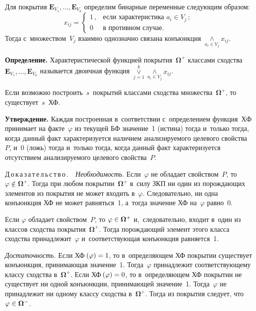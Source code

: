 \begin{multicols}{2}
  Для покрытия $\mathbf{E}_{V_1},\ldots , \mathbf{E}_{V_k}$ определим 
бинарные переменные следующим образом:
  $$
  x_{ij}=\begin{cases}
  1\,, & \mbox{если\ характеристика } a_i\in V_j\,;\\
  0 & \mbox{в~противном случае}.
  \end{cases}
  $$
  Тогда с~множеством~$V_j$ взаимно однозначно связана конъюнкция 
$\mathop{\wedge}\limits_{a_i\in V_j} x_{ij}$.
  
  \smallskip
  
  \noindent
  \textbf{Определение.} Характеристической функцией 
покрытия~$\boldsymbol{\Omega}^+$ классами сходства $\mathbf{E}_{V_1},\ldots 
, \mathbf{E}_{V_k}$ называется двоичная функция  
$\mathop{\vee}\limits^k_{j=1}\mathop{\wedge}\limits_{a_i\in V_j} x_{ij}$.
  
  Если возможно построить~$s$~покрытий классами сходства 
множества~$\boldsymbol{\Omega}^+$, то существует~$s$~ХФ. 
  
  \smallskip
  
  \noindent
  \textbf{Утверждение.} Каждая построенная в~соответствии с~определением 
функция~$\mathrm{ХФ}$ принимает на факте~$\varphi$ из текущей БФ значение~1 (истина) 
тогда и~только тогда, когда данный факт характеризуется наличием 
анализируемого целевого свойства~$P$, и~0 (ложь) тогда и~только тогда, когда 
данный факт характеризуется отсутствием анализируемого целевого 
свойства~$P$.
  
  \smallskip
  
  \noindent
  Д\,о\,к\,а\,з\,а\,т\,е\,л\,ь\,с\,т\,в\,о\,.\ \ \textit{Необходимость}. Если~$\varphi$ не 
обладает свойством~$P$, то $\varphi\not\in \boldsymbol{\Omega}^+$. Тогда при 
любом покрытии~$\boldsymbol{\Omega}^+$ в~силу ЗКП ни один из порождающих 
элементов из покрытия не может входить в~$\varphi$. Следовательно, ни одна 
конъюнкция ХФ не может равняться~1, а~тогда значение 
ХФ на~$\varphi$ равно~0. 
  
  Если $\varphi$ обладает свойством~$P$, то 
$\varphi\hm\in\boldsymbol{\Omega}^+$ и,~следовательно, входит в~один из 
классов сходства покрытия~$\boldsymbol{\Omega}^+$. Тогда порождающий 
элемент этого класса сходства принадлежит~$\varphi$ и~соответствующая 
конъюнкция равняется~1. 
  
  \noindent
  \textit{Достаточность.} Если ХФ\,$(\varphi)\hm=1$, то в~определяющем ХФ 
покрытии существует конъюнкция, принимающая значение~1. Тогда~$\varphi$ 
принадлежит соответствующему классу сходства в~$\boldsymbol{\Omega}^+$. 
Если ХФ\,$(\varphi)\hm=0$, то в~определяющем ХФ покрытии не существует ни 
одной конъюнкции, принимающей значение~1. Тогда~$\varphi$ не принадлежит 
ни одному классу сходства в~$\boldsymbol{\Omega}^+$. Тогда из покрытия 
следует, что $\varphi \hm \in \boldsymbol{\Omega}^-$.
  

\end{multicols}
